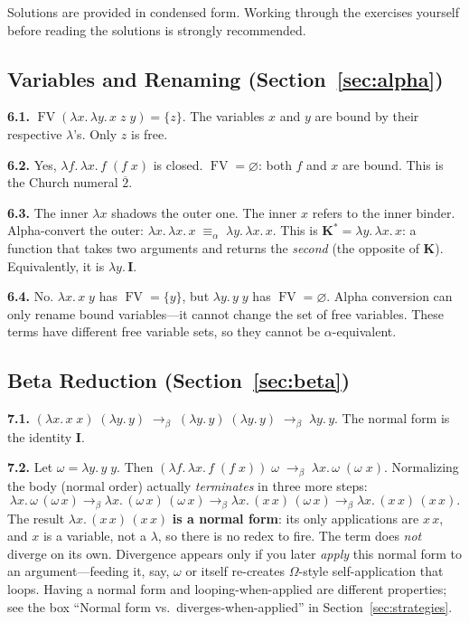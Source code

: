\documentclass[11pt,a4paper]{article}
\newcounter{exercise}[section]
\theoremstyle{definition}
\newcommand{\lam}{\lambda}
\newcommand{\reduce}{\longrightarrow_\beta}
\newcommand{\aeq}{\equiv_\alpha}
\newcommand{\FV}{\operatorname{FV}}
\newcommand{\church}[1]{\overline{#1}}
\begin{document}
Solutions are provided in condensed form. Working through the exercises
yourself before reading the solutions is strongly recommended.

\subsection*{Variables and Renaming (Section~\ref{sec:alpha})}

\textbf{6.1.}\; $\FV(\lam x.\, \lam y.\, x\; z\; y) = \{z\}$. The variables $x$ and $y$ are bound by their respective $\lam$'s. Only $z$ is free.

\medskip
\textbf{6.2.}\; Yes, $\lam f.\, \lam x.\, f\;(f\;x)$ is closed. $\FV = \varnothing$: both $f$ and $x$ are bound. This is the Church numeral $\church{2}$.

\medskip
\textbf{6.3.}\; The inner $\lam x$ shadows the outer one. The inner $x$ refers to the inner binder. Alpha-convert the outer: $\lam x.\, \lam x.\, x \;\aeq\; \lam y.\, \lam x.\, x$. This is $\mathbf{K}^* = \lam y.\, \lam x.\, x$: a function that takes two arguments and returns the \emph{second} (the opposite of $\mathbf{K}$). Equivalently, it is $\lam y.\, \mathbf{I}$.

\medskip
\textbf{6.4.}\; No. $\lam x.\, x\;y$ has $\FV = \{y\}$, but $\lam y.\, y\;y$ has $\FV = \varnothing$. Alpha conversion can only rename bound variables---it cannot change the set of free variables. These terms have different free variable sets, so they cannot be $\alpha$-equivalent.

\subsection*{Beta Reduction (Section~\ref{sec:beta})}

\textbf{7.1.}\; $(\lam x.\, x\;x)\;(\lam y.\, y) \;\reduce\; (\lam y.\, y)\;(\lam y.\, y) \;\reduce\; \lam y.\, y$. The normal form is the identity $\mathbf{I}$.

\medskip
\textbf{7.2.}\; Let $\omega = \lam y.\, y\;y$. Then
$(\lam f.\, \lam x.\, f\;(f\;x))\;\omega \;\reduce\; \lam x.\, \omega\;(\omega\;x)$.
Normalizing the body (normal order) actually \emph{terminates} in three more steps:
\[
  \lam x.\, \omega\,(\omega\,x)
  \reduce \lam x.\, (\omega\,x)\,(\omega\,x)
  \reduce \lam x.\, (x\,x)\,(\omega\,x)
  \reduce \lam x.\, (x\,x)\,(x\,x).
\]
The result $\lam x.\, (x\,x)\,(x\,x)$ \textbf{is a normal form}: its only
applications are $x\,x$, and $x$ is a variable, not a $\lam$, so there is no
redex to fire. The term does \emph{not} diverge on its own. Divergence appears
only if you later \emph{apply} this normal form to an argument---feeding it,
say, $\omega$ or itself re-creates $\Omega$-style self-application that loops.
Having a normal form and looping-when-applied are different properties; see the
box ``Normal form vs.\ diverges-when-applied'' in Section~\ref{sec:strategies}.
\end{document}
